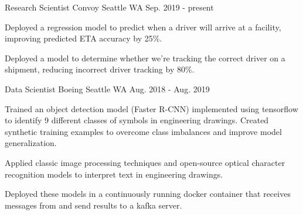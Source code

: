 


\begin{cventries}


\cventry
{Research Scientist} %
{Convoy} %
{Seattle WA} %
{Sep. 2019 - present} %
{
\begin{cvitems}
 \vspace{0.1cm}
\item {Deployed a regression model to predict when a driver will arrive at a facility, improving predicted ETA accuracy by 25\%.\vspace{0.1cm}}
\item {Deployed a model to determine whether we’re tracking the correct driver on a shipment, reducing incorrect driver tracking by 80\%.}
\end{cvitems}
}


\cventry
{Data Scientist} %
{Boeing} %
{Seattle WA} %
{Aug. 2018 - Aug. 2019} %
{ %
\begin{cvitems}
 \vspace{0.1cm}
\item {Trained an object detection model (Faster R-CNN) implemented using tensorflow to identify 9 different classes of symbols in engineering drawings. Created synthetic training examples to overcome class imbalances and improve model generalization.\vspace{0.1cm}}
\item {Applied classic image processing techniques and open-source optical character recognition models to interpret text in engineering drawings. \vspace{0.1cm}}
\item {Deployed these models in a continuously running docker container that receives messages from and send results to a kafka server.}
\end{cvitems}
}


\end{cventries}
